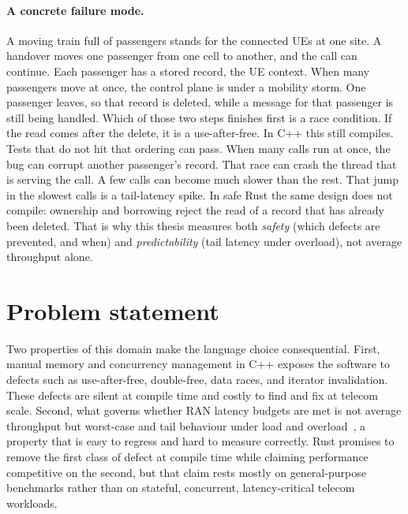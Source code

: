 \documentclass[english,oneside,a4paper,censored,csm,software-track-2020]{HYthesisML}
\begin{document}
\paragraph{A concrete failure mode.}
A moving train full of passengers stands for the connected UEs at one site.
A handover moves one passenger from one cell to another, and the call can
continue. Each passenger has a stored record, the UE context. When many
passengers move at once, the control plane is under a mobility storm. One
passenger leaves, so that record is deleted, while a message for that
passenger is still being handled. Which of those two steps finishes first is a
race condition. If the read comes after the delete, it is a use-after-free.
In C++ this still compiles. Tests that do not hit that ordering can pass.
When many calls run at once, the bug can corrupt another passenger's record.
That race can crash the thread that is serving the call. A few calls can
become much slower than the rest. That jump in the slowest calls is a
tail-latency spike. In safe
Rust the same design does not compile: ownership and borrowing reject the read
of a record that has already been deleted. That is why this thesis measures
both \emph{safety} (which defects are prevented, and when) and
\emph{predictability} (tail latency under overload), not average throughput
alone.

\section{Problem statement}
Two properties of this domain make the language choice consequential. First, manual memory and
concurrency management in C++ exposes the software to defects such as use-after-free,
double-free, data races, and iterator invalidation. These defects are silent at compile time and
costly to find and fix at telecom scale. Second, what governs whether RAN latency budgets are met is not
average throughput but worst-case and tail behaviour under load and
overload~\cite{dean2013tail}, a property that is easy to regress and hard to measure correctly.
Rust promises to remove the first class of defect at compile time while claiming performance
competitive on the second, but that claim rests mostly on general-purpose benchmarks rather
than on stateful, concurrent, latency-critical telecom workloads.
\end{document}
